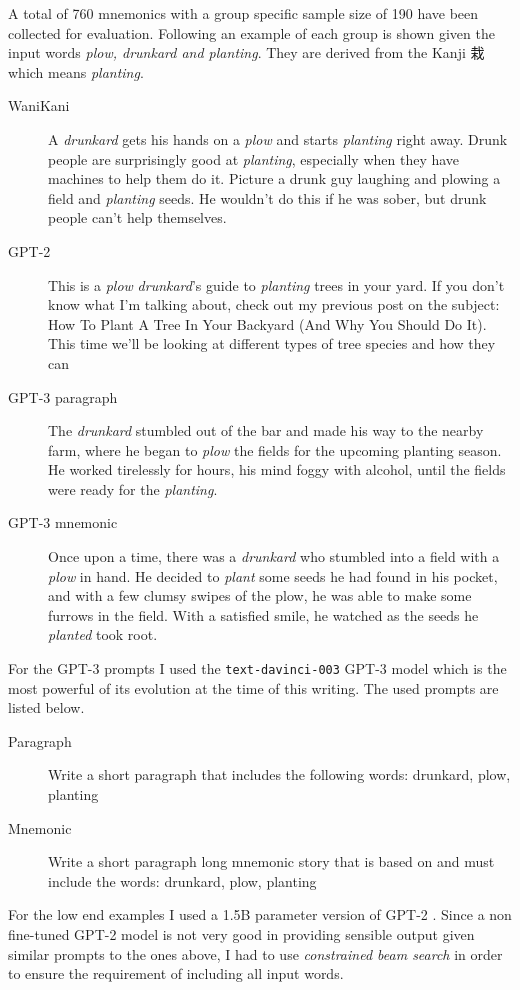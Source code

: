 A total of 760 mnemonics with a group specific sample size of 190 have been collected for evaluation. Following an example of each group is shown given the input words \emph{plow, drunkard and planting}. They are derived from the Kanji 栽 which means \emph{planting}.
\begin{description}
    \item[WaniKani] A \emph{drunkard} gets his hands on a \emph{plow} and starts \emph{planting} right away. Drunk people are surprisingly good at \emph{planting}, especially when they have machines to help them do it. Picture a drunk guy laughing and plowing a field and \emph{planting} seeds. He wouldn't do this if he was sober, but drunk people can't help themselves.
    \item[GPT-2]  This is a \emph{plow} \emph{drunkard}'s guide to \emph{planting} trees in your yard. If you don't know what I'm talking about, check out my previous post on the subject: How To Plant A Tree In Your Backyard (And Why You Should Do It). This time we'll be looking at different types of tree species and how they can
    \item[GPT-3 paragraph] The \emph{drunkard} stumbled out of the bar and made his way to the nearby farm, where he began to \emph{plow} the fields for the upcoming planting season. He worked tirelessly for hours, his mind foggy with alcohol, until the fields were ready for the \emph{planting}.
    \item[GPT-3 mnemonic] Once upon a time, there was a \emph{drunkard} who stumbled into a field with a \emph{plow} in hand. He decided to \emph{plant} some seeds he had found in his pocket, and with a few clumsy swipes of the plow, he was able to make some furrows in the field. With a satisfied smile, he watched as the seeds he \emph{planted} took root. 
\end{description}
For the GPT-3 prompts I used the \texttt{text-davinci-003} GPT-3 model which is the most powerful of its evolution at the time of this writing. The used prompts are listed below.
\begin{description}
    \item[Paragraph] Write a short paragraph that includes the following words: drunkard, plow, planting
    \item[Mnemonic] Write a short paragraph long mnemonic story that is based on and must include the words: drunkard, plow, planting
\end{description}
For the low end examples I used a 1.5B parameter version of GPT-2 \cite{radford2019language}. Since a non fine-tuned GPT-2 model is not very good in providing sensible output given similar prompts to the ones above, I had to use \emph{constrained beam search} in order to ensure the requirement of including all input words.

